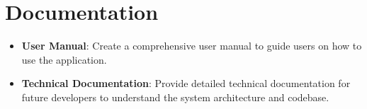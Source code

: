\section{Documentation}
\begin{itemize}
    \item \textbf{User Manual}: Create a comprehensive user manual to guide users on how to use the application.
    \item \textbf{Technical Documentation}: Provide detailed technical documentation for future developers to understand the system architecture and codebase.
\end{itemize}